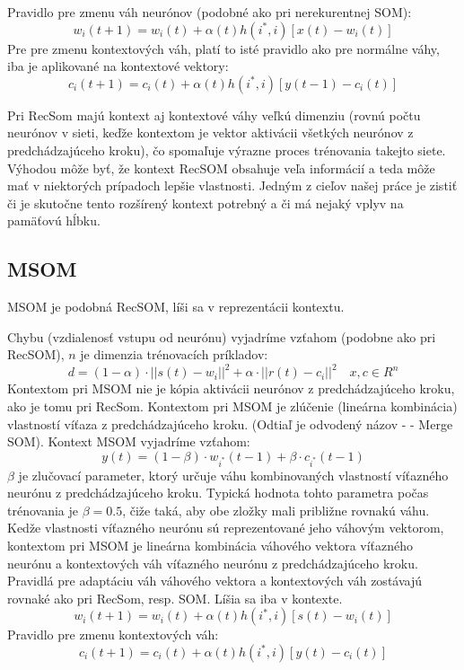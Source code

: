 Pravidlo pre zmenu váh neurónov (podobné ako pri nerekurentnej SOM):
\begin{equation}
	w_i(t + 1) = w_i(t) + \alpha(t)h(i^*, i)[x(t) - w_i(t)]
\end{equation}
Pre pre zmenu kontextových váh, platí to isté pravidlo ako pre normálne váhy, iba je aplikované 
na kontextové vektory:
\begin{equation}
	c_i(t + 1) = c_i(t) + \alpha(t)h(i^*, i)[y(t - 1) - c_i(t)]
\end{equation}

Pri RecSom majú kontext aj kontextové váhy veľkú dimenziu (rovnú počtu neurónov v sieti, keďže kontextom je vektor aktivácii všetkých neurónov z predchádzajúceho kroku), 
čo spomaľuje výrazne proces trénovania takejto siete.
Výhodou môže byť, že kontext RecSOM obsahuje veľa informácií a teda môže mať v niektorých prípadoch
lepšie vlastnosti. 
Jedným z cieľov našej práce je zistiť či je skutočne tento rozšírený kontext potrebný a či 
má nejaký vplyv na pamäťovú hĺbku.


\subsection{MSOM}
MSOM je podobná RecSOM, líši sa v reprezentácii kontextu. \cite{DBLP:journals/ijon/StrickertH05}

Chybu (vzdialenosť vstupu od neurónu) vyjadríme vzťahom (podobne ako pri RecSOM), 
$n$ je dimenzia trénovacích príkladov:
\begin{equation}
	d = (1 - \alpha) \cdot ||s(t) - w_i||^{2} + \alpha \cdot ||r(t) - c_i||^{2} \quad x, c \in R^{n}
\end{equation}
Kontextom pri MSOM nie je kópia aktivácii neurónov z predchádzajúceho kroku, ako je tomu pri RecSom. 
Kontextom pri MSOM je zlúčenie (lineárna kombinácia) vlastností víťaza z predchádzajúceho kroku.
(Odtiaľ je odvodený názov -  - Merge SOM). 
Kontext MSOM vyjadríme vzťahom:
\begin{equation}
	y(t) = (1 - \beta) \cdot w_{i^{*}}(t-1) + \beta \cdot c_{i^{*}}(t-1)
\end{equation}
$\beta$ je zlučovací parameter, ktorý určuje váhu kombinovaných vlastností
víťazného neurónu z predchádzajúceho kroku. Typická hodnota tohto parametra
počas trénovania je $\beta = 0.5$, čiže taká, aby obe zložky mali približne 
rovnakú váhu. 
Kedže vlastnosti víťazného neurónu sú reprezentované jeho váhovým vektorom, 
kontextom pri MSOM je lineárna kombinácia váhového vektora víťazného neurónu a 
kontextových váh víťazného neurónu z predchádzajúceho kroku.
Pravidlá pre adaptáciu váh váhového vektora a kontextových váh zostávajú rovnaké ako pri RecSom, resp. SOM. Líšia sa iba v kontexte.
\begin{equation}
	w_i(t + 1) = w_i(t) + \alpha(t)h(i^*, i)[s(t) - w_i(t)]
\end{equation}
Pravidlo pre zmenu kontextových váh:
\begin{equation}
	c_i(t + 1) = c_i(t) + \alpha(t)h(i^*, i)[y(t) - c_i(t)]
\end{equation}

